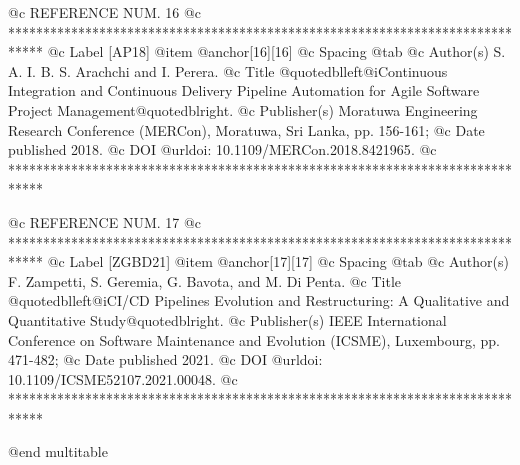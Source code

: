 @c REFERENCE NUM. 16
@c *****************************************************************************
@c Label [AP18]
@item @anchor{[16]}[16]
@c Spacing
@tab
@c Author(s)
S. A. I. B. S. Arachchi and I. Perera.
@c Title
@quotedblleft{}@i{Continuous Integration and Continuous Delivery Pipeline Automation for Agile Software Project Management}@quotedblright{}.
@c Publisher(s)
Moratuwa Engineering Research Conference (MERCon), Moratuwa, Sri Lanka, pp. 156-161;
@c Date published
2018.
@c DOI
@url{doi: 10.1109/MERCon.2018.8421965}.
@c *****************************************************************************

@c REFERENCE NUM. 17
@c *****************************************************************************
@c Label [ZGBD21]
@item @anchor{[17]}[17]
@c Spacing
@tab
@c Author(s)
F. Zampetti, S. Geremia, G. Bavota, and M. Di Penta.
@c Title
@quotedblleft{}@i{CI/CD Pipelines Evolution and Restructuring: A Qualitative and Quantitative Study}@quotedblright{}.
@c Publisher(s)
IEEE International Conference on Software Maintenance and Evolution (ICSME), Luxembourg, pp. 471-482;
@c Date published
2021.
@c DOI
@url{doi: 10.1109/ICSME52107.2021.00048}.
@c *****************************************************************************

@end multitable
